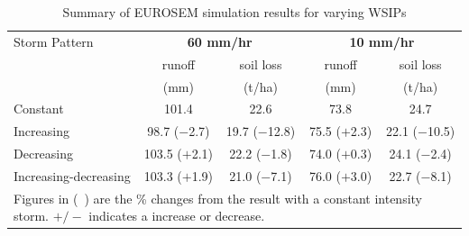 \begin{table}[htbp]
  \caption{Summary of EUROSEM simulation results for varying WSIPs}
  \label{tab:EUROSEMSimulationResults}
  \centering
    \begin{tabular}{lcccc}
      \toprule
      Storm Pattern & \multicolumn{2}{c}{\textbf{60 mm/hr}} &
\multicolumn{2}{c}{\textbf{10 mm/hr}}\\
      \cmidrule(r){2-3} \cmidrule(l){4-5}
      & runoff  & soil loss  & runoff & soil loss \\
      & (mm) & (t/ha) & (mm) & (t/ha) \\
      \midrule
      Constant   & 101.4 & 22.6 & 73.8 & 24.7\\
      Increasing & 98.7 ($-$2.7)& 19.7 ($-$12.8)& 75.5 ($+$2.3)& 22.1
($-$10.5)\\
      Decreasing & 103.5 ($+$2.1)& 22.2 ($-$1.8)& 74.0 ($+$0.3) & 24.1
($-$2.4)\\
      Increasing-decreasing & 103.3 ($+$1.9)& 21.0 ($-$7.1)& 76.0 ($+$3.0)& 22.7
($-$8.1)\\
      \bottomrule
      \multicolumn{5}{p{10cm}}{\footnotesize Figures in (\ )
are the \% changes from the result with a constant intensity storm. $+/-$
indicates a increase or decrease.}\\
    \end{tabular}
\end{table}


